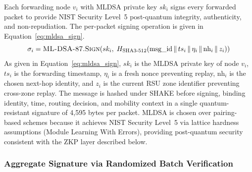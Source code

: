 \documentclass[12pt, a4paper]{report}
\begin{document}
Each forwarding node $v_i$ with \ac{MLDSA} private key
$sk_i$ signs every forwarded packet to provide NIST
Security Level~5 post-quantum integrity, authenticity,
and non-repudiation. The per-packet signing operation
is given in Equation~\eqref{eq:mldsa_sign}.
\begin{equation}
\sigma_i = \textsc{ML-DSA-87.Sign}\!\left(sk_i,\;
H_{\text{SHA3-512}}\!\left(
\text{msg\_id} \,\|\, ts_i \,\|\,
\eta_i \,\|\, \text{nh}_i \,\|\, z_i
\right)\right)
\label{eq:mldsa_sign}
\end{equation}
As given in Equation~\eqref{eq:mldsa_sign}, $sk_i$ is
the \ac{MLDSA} private key of node $v_i$, $ts_i$ is
the forwarding timestamp, $\eta_i$ is a fresh nonce
preventing replay, $\text{nh}_i$ is the chosen next-hop
identity, and $z_i$ is the current \ac{RSU} zone
identifier preventing cross-zone replay. The message is
hashed under \ac{SHAKE} before signing, binding identity,
time, routing decision, and mobility context in a single
quantum-resistant signature of 4{,}595 bytes per
packet. \ac{MLDSA} is chosen over pairing-based schemes
because it achieves NIST Security Level~5 via lattice
hardness assumptions (Module Learning With Errors),
providing post-quantum security consistent with the
\ac{ZKP} layer described below.




\subsubsection{Aggregate Signature via Randomized
Batch Verification}
\end{document}
